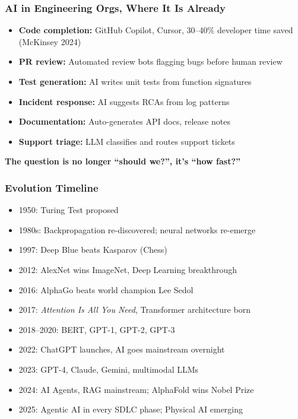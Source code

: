 \begin{frame}[fragile]\frametitle{AI in Engineering Orgs, Where It Is Already}
\begin{itemize}
\item \textbf{Code completion:} GitHub Copilot, Cursor, 30--40\% developer time saved (McKinsey 2024)
\item \textbf{PR review:} Automated review bots flagging bugs before human review
\item \textbf{Test generation:} AI writes unit tests from function signatures
\item \textbf{Incident response:} AI suggests RCAs from log patterns
\item \textbf{Documentation:} Auto-generates API docs, release notes
\item \textbf{Support triage:} LLM classifies and routes support tickets
\end{itemize}
\textbf{The question is no longer ``should we?'', it's ``how fast?''}
\end{frame}

\begin{frame}[fragile]\frametitle{Evolution Timeline}
\begin{itemize}
\item 1950: Turing Test proposed
\item 1980s: Backpropagation re-discovered; neural networks re-emerge
\item 1997: Deep Blue beats Kasparov (Chess)
\item 2012: AlexNet wins ImageNet, Deep Learning breakthrough
\item 2016: AlphaGo beats world champion Lee Sedol
\item 2017: \textit{Attention Is All You Need}, Transformer architecture born
\item 2018--2020: BERT, GPT-1, GPT-2, GPT-3
\item 2022: ChatGPT launches, AI goes mainstream overnight
\item 2023: GPT-4, Claude, Gemini, multimodal LLMs
\item 2024: AI Agents, RAG mainstream; AlphaFold wins Nobel Prize
\item 2025: Agentic AI in every SDLC phase; Physical AI emerging
\end{itemize}
\end{frame}


